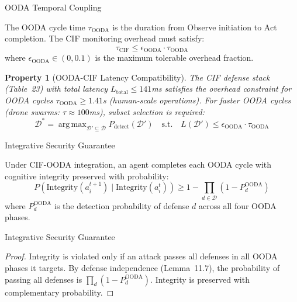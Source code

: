 \documentclass[
  ignorenonframetext,
]{beamer}
\DeclareMathOperator*{\argmax}{arg\,max}
\newtheorem{property}{Property}
\begin{document}
\begin{frame}[allowframebreaks]{OODA Temporal Coupling}
\protect{}\label{ooda-temporal-coupling}
\begin{definition}
\label{def:ooda-cycle-time}
The OODA cycle time $\tau_{\text{OODA}}$ is the duration from Observe initiation to Act completion. The CIF monitoring overhead must satisfy:
\begin{equation}
\label{eq:ooda-overhead}
\tau_{\text{CIF}} \leq \epsilon_{\text{OODA}} \cdot \tau_{\text{OODA}}
\end{equation}
where $\epsilon_{\text{OODA}} \in (0, 0.1)$ is the maximum tolerable overhead fraction.
\end{definition}

\begin{property}[OODA-CIF Latency Compatibility]
\label{prop:ooda-latency}
The CIF defense stack (Table~23) with total latency $L_{\text{total}} \leq 141$ms satisfies the overhead constraint for OODA cycles $\tau_{\text{OODA}} \geq 1.41$s (human-scale operations). For faster OODA cycles (drone swarms: $\tau \approx 100$ms), subset selection is required:
\begin{equation}
\label{eq:ooda-subset}
\mathcal{D}^* = \argmax_{\mathcal{D}' \subseteq \mathcal{D}} P_{\text{detect}}(\mathcal{D}') \quad \text{s.t.} \quad L(\mathcal{D}') \leq \epsilon_{\text{OODA}} \cdot \tau_{\text{OODA}}
\end{equation}
\end{property}
\end{frame}

\begin{frame}[allowframebreaks]{Integrative Security Guarantee}
\protect{}\label{integrative-security-guarantee}
\begin{theorem}
\label{thm:cif-ooda-invariant}
Under CIF-OODA integration, an agent completes each OODA cycle with cognitive integrity preserved with probability:
\begin{equation}
\label{eq:cif-ooda-guarantee}
P(\text{Integrity}(a_i^{t+1}) \mid \text{Integrity}(a_i^t)) \geq 1 - \prod_{d \in \mathcal{D}} (1 - P_d^{\text{OODA}})
\end{equation}
where $P_d^{\text{OODA}}$ is the detection probability of defense $d$ across all four OODA phases.
\end{theorem}

\end{frame}

\begin{frame}[allowframebreaks]{Integrative Security Guarantee}
\begin{proof}
Integrity is violated only if an attack passes all defenses in all OODA phases it targets. By defense independence (Lemma~11.7), the probability of passing all defenses is $\prod_d (1 - P_d^{\text{OODA}})$. Integrity is preserved with complementary probability.
\end{proof}
\end{frame}
\end{document}
